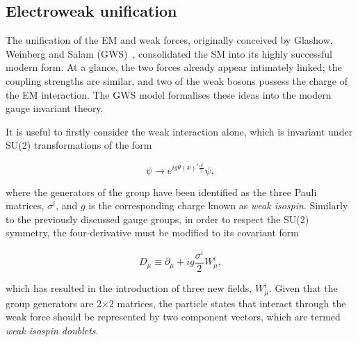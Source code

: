 \subsection{Electroweak unification}

The unification of the EM and weak forces, originally conceived by Glashow, Weinberg and Salam (GWS)~\cite{Glashow,Weinberg,Salam}, consolidated the SM into its highly successful modern form. At a glance, the two forces already appear intimately linked; the coupling strengths are similar, and two of the weak bosons possess the charge of the EM interaction. The GWS model formalises these ideas into the modern gauge invariant theory.

It is useful to firstly consider the weak interaction alone, which is invariant under SU(2) transformations of the form

\begin{equation}
    \psi \rightarrow e^{ig\theta(x)^{i}\frac{\sigma^{i}}{2}}\psi,
\end{equation}

\noindent where the generators of the group have been identified as the three Pauli matrices, ${\sigma^{i}}$, and ${g}$ is the corresponding charge known as \textit{weak isospin}. Similarly to the previously discussed gauge groups, in order to respect the SU(2) symmetry, the four-derivative must be modified to its covariant form

\begin{equation}
    D_\mu \equiv \partial_\mu + ig\frac{\sigma^{i}}{2}W_{\mu}^{i},
\end{equation}

\noindent which has resulted in the introduction of three new fields, ${W_{\mu}^{i}}$. Given that the group generators are 2${\times}$2 matrices, the particle states that interact through the weak force should be represented by two component vectors, which are termed \textit{weak isospin doublets}. 


